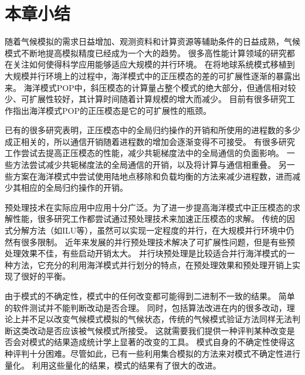 \section{本章小结}
\label{related:Conclude}

随着气候模拟的需求日益增加、观测资料和计算资源等辅助条件的日益成熟，气候模式不断地提高模拟精度已经成为一个大的趋势。
很多高性能计算领域的研究都在关注如何使得科学应用能够适应大规模的并行环境。 
在将地球系统模式移植到大规模并行环境上的过程中，海洋模式中的正压模态的差的可扩展性逐渐的暴露出来。 
海洋模式POP中，斜压模态的计算量占整个模式的绝大部分，但通信相对较少、可扩展性较好，其计算时间随着计算规模的增大而减少。
目前有很多研究工作指出海洋模式POP的正压模态是它的可扩展性的瓶颈。

已有的很多研究表明，正压模态中的全局归约操作的开销和所使用的进程数的多少成正相关的，所以通信开销随着进程数的增加会逐渐变得不可接受。
有很多研究工作尝试去提高正压模态的性能，减少共轭梯度法中的全局通信的负面影响。
一些方法尝试减少共轭梯度法的全局通信的开销，以及将计算与通信相重叠。 
另一些方案在海洋模式中尝试使用陆地点移除和负载均衡的方法来减少进程数，进而减少其相应的全局归约操作的开销。 

预处理技术在实际应用中应用十分广泛。为了进一步提高海洋模式中正压模态的求解性能，很多研究工作都尝试通过预处理技术来加速正压模态的求解。 
传统的因式分解方法（如ILU等），虽然可以实现一定程度的并行，在大规模并行环境中仍然有很多限制。
近年来发展的并行预处理技术解决了可扩展性问题，但是有些预处理效果不佳，有些启动开销太大。 
并行块预处理是比较适合并行海洋模式的一种方法，它充分的利用海洋模式并行划分的特点，在预处理效果和预处理开销上实现了很好的平衡。

由于模式的不确定性，模式中的任何改变都可能得到二进制不一致的结果。
简单的软件测试并不能判断改动是否合理。
同时，包括算法改进在内的很多改动，理论上并不足以改变气候模式模拟的气候状态，传统的气候模式验证方法同样无法判断这类改动是否应该被气候模式所接受。
这就需要我们提供一种评判某种改变是否会对模式的结果造成统计学上显著的改变的工具。
模式自身的不确定性使得这种评判十分困难。尽管如此，已有一些利用集合模拟的方法来对模式不确定性进行量化。
利用这些量化的结果，模式的结果有了很大的改进。 

 


